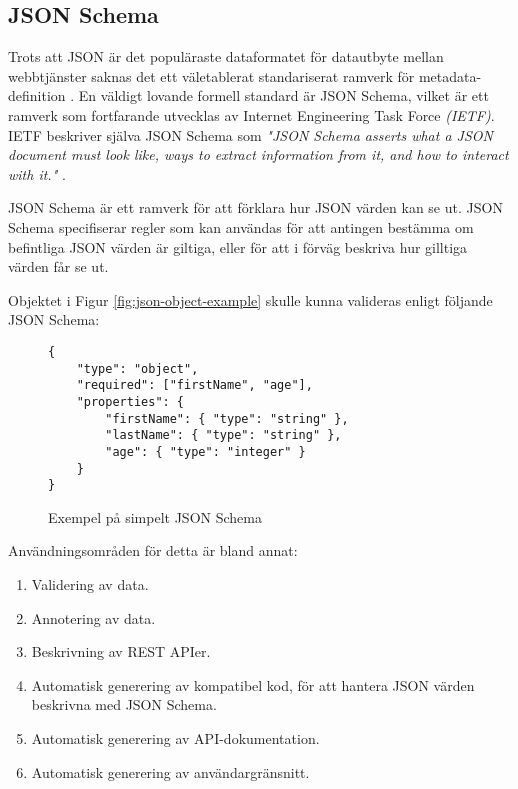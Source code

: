 \documentclass[swedish]{kththesis}
\begin{document}

\subsection{JSON Schema}
Trots att JSON är det populäraste dataformatet för datautbyte mellan webbtjänster saknas det ett väletablerat standariserat ramverk för metadata-definition \cite{Pezoa2016}. En väldigt lovande formell standard är JSON Schema, vilket är ett ramverk som fortfarande utvecklas av Internet Engineering Task Force \textit{(IETF)}. IETF beskriver själva JSON Schema som \textit{"JSON Schema asserts what a JSON document must look like, ways to extract information from it, and how to interact with it."} \cite{A.Wright}.

JSON Schema är ett ramverk för att förklara hur JSON värden kan se ut. JSON Schema specifiserar regler som kan användas för att antingen bestämma om befintliga JSON värden är giltiga, eller för att i förväg beskriva hur gilltiga värden får se ut. 

Objektet i Figur \ref{fig:json-object-example} skulle kunna valideras enligt följande JSON Schema:

\begin{figure}[h]
	\begin{verbatim}
{
	"type": "object",
	"required": ["firstName", "age"],
	"properties": {
		"firstName": { "type": "string" },
		"lastName": { "type": "string" },
		"age": { "type": "integer" }
	}
}
	\end{verbatim}
	\vspace{-1.5em}
	\caption{Exempel på simpelt JSON Schema}
\end{figure}

\noindent
Användningsområden för detta är bland annat:


\begin{enumerate}
	\item Validering av data.
	\item Annotering av data.
	\item Beskrivning av REST APIer.
	\item Automatisk generering av kompatibel kod, för att hantera JSON värden beskrivna med JSON Schema.
	\item Automatisk generering av API-dokumentation.
	\item Automatisk generering av användargränsnitt.
\end{enumerate}
\end{document}
